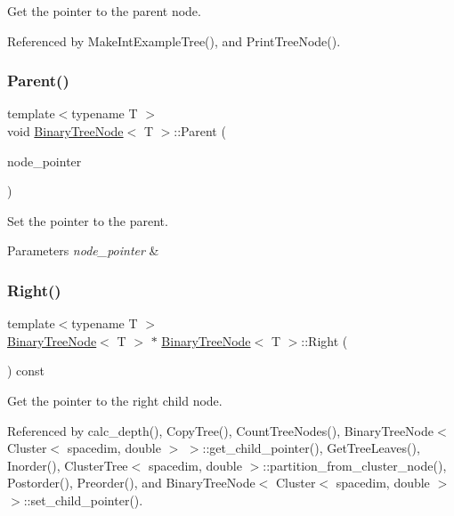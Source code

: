 Get the pointer to the parent node. 

Referenced by Make\+Int\+Example\+Tree(), and Print\+Tree\+Node().

\mbox{\label{classBinaryTreeNode_abd72fc34f46fb41abdf9a692b4db0cdd}} 
\subsubsection{\texorpdfstring{Parent()}{Parent()}\hspace{0.1cm}{\footnotesize\ttfamily [2/2]}}
{\footnotesize\ttfamily template$<$typename T $>$ \\
void \hyperlink{classBinaryTreeNode}{Binary\+Tree\+Node}$<$ T $>$\+::Parent (\begin{DoxyParamCaption}\item[{const \hyperlink{classBinaryTreeNode}{Binary\+Tree\+Node}$<$ T $>$ $\ast$}]{node\+\_\+pointer }\end{DoxyParamCaption})}

Set the pointer to the parent. 
\begin{DoxyParams}{Parameters}
{\em node\+\_\+pointer} & \\
\hline
\end{DoxyParams}
\mbox{\label{classBinaryTreeNode_ade872fc08f12c154c28c934a3991ae08}} 
\subsubsection{\texorpdfstring{Right()}{Right()}\hspace{0.1cm}{\footnotesize\ttfamily [1/2]}}
{\footnotesize\ttfamily template$<$typename T $>$ \\
\hyperlink{classBinaryTreeNode}{Binary\+Tree\+Node}$<$ T $>$ $\ast$ \hyperlink{classBinaryTreeNode}{Binary\+Tree\+Node}$<$ T $>$\+::Right (\begin{DoxyParamCaption}\item[{void}]{ }\end{DoxyParamCaption}) const}

Get the pointer to the right child node. 

Referenced by calc\+\_\+depth(), Copy\+Tree(), Count\+Tree\+Nodes(), Binary\+Tree\+Node$<$ Cluster$<$ spacedim, double $>$ $>$\+::get\+\_\+child\+\_\+pointer(), Get\+Tree\+Leaves(), Inorder(), Cluster\+Tree$<$ spacedim, double $>$\+::partition\+\_\+from\+\_\+cluster\+\_\+node(), Postorder(), Preorder(), and Binary\+Tree\+Node$<$ Cluster$<$ spacedim, double $>$ $>$\+::set\+\_\+child\+\_\+pointer().

